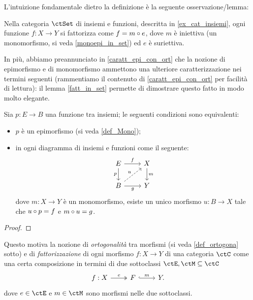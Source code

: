 \medskip
L'intuizione fondamentale dietro la definizione è la seguente osservazione/lemma:
\begin{lemma}\label{fatt_in_set}
	Nella categoria \(\ctSet\) di insiemi e funzioni, descritta in \ref{ex_cat_insiemi}, ogni funzione \(f : X \to Y\) si fattorizza come \(f = m \circ e\), dove \(m\) è iniettiva (un monomorfismo, si veda \ref{monoepi_in_set}) ed \(e\) è suriettiva.%
\end{lemma}
In più, abbiamo preannunciato in \ref{caratt_epi_con_ort} che la nozione di epimorfismo e di monomorfismo ammettono una ulteriore caratterizzazione nei termini seguenti (rammentiamo il contenuto di \ref{caratt_epi_con_ort} per facilità di lettura): il lemma \ref{fatt_in_set} permette di dimostrare questo fatto in modo molto elegante.
\begin{proposition*}
	Sia \(p : E \to B\) una funzione tra insiemi; le seguenti condizioni sono equivalenti:
	\begin{itemize}
		\item \(p\) è un epimorfismo (si veda \ref{def_Mono});
		\item in ogni diagramma di insiemi e funzioni come il seguente:
		      \[\begin{tikzcd}
				      E \ar[r, "f"]\ar[d, "p"']& X \ar[d, "m"]\\
				      B \ar[r, "g"'] \ar[ur, dashed, "u"]& Y
			      \end{tikzcd}\]
		      dove \(m : X\to Y\) è un monomorfismo, esiste un unico morfismo \(u : B\to X\) tale che \(u\circ p = f\) e \(m\circ u = g\).
	\end{itemize}
\end{proposition*}
\begin{proof}
\end{proof}
Questo motiva la nozione di \emph{ortogonalità} tra morfismi (si veda \ref{def_ortogona} sotto) e di \emph{fattorizzazione} di ogni morfismo \(f : X\to Y\) di una categoria \(\ctC\) come una certa composizione in termini di due sottoclassi \(\ctE,\ctM\subseteq\ctC\)
\[
	\begin{tikzcd}
		f : X \ar[r, "e", two heads]& F \ar[r, "m", hook] & Y.
	\end{tikzcd}
\]
dove \(e\in\ctE\) e \(m\in\ctM\) sono morfismi nelle due sottoclassi.

